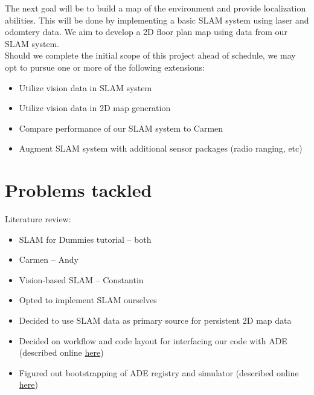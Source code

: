 \documentclass[12pt]{article}
\begin{document}
The next goal will be to build a map of the environment and provide
localization abilities. This will be done by implementing a basic SLAM
system using laser and odomtery data.  We aim to develop a 2D floor plan map
using data from our SLAM system.\\

Should we complete the initial scope of this project ahead of schedule, we may
opt to pursue one or more of the following extensions:

\begin{itemize}
    \setlength{\itemsep}{0pt}
    \setlength{\parskip}{0pt}
    \setlength{\parsep}{0pt}
    \item Utilize vision data in SLAM system
    \item Utilize vision data in 2D map generation
    \item Compare performance of our SLAM system to Carmen
    \item Augment SLAM system with additional sensor packages (radio ranging,
          etc)
\end{itemize}


\section{Problems tackled}

Literature review:
\begin{itemize}
    \setlength{\itemsep}{0pt}
    \setlength{\parskip}{0pt}
    \setlength{\parsep}{0pt}
    \item SLAM for Dummies tutorial -- both
    \item Carmen -- Andy
    \item Vision-based SLAM -- Constantin
\end{itemize}

\begin{itemize}
    \setlength{\itemsep}{0pt}
    \setlength{\parskip}{0pt}
    \setlength{\parsep}{0pt}
    \item Opted to implement SLAM ourselves
    \item Decided to use SLAM data as primary source for persistent 2D map data
\end{itemize}

\begin{itemize}
    \setlength{\itemsep}{0pt}
    \setlength{\parskip}{0pt}
    \setlength{\parsep}{0pt}
    \item Decided on workflow and code layout for interfacing our code with ADE
          (described online
          \href{http://github.com/cberzan/bbr-mapper/raw/master/WORKFLOW}{here})
    \item Figured out bootstrapping of ADE registry and simulator (described
          online 
          \href{http://github.com/cberzan/bbr-mapper/raw/master/BOOTSTRAP}{here})
\end{itemize}
\end{document}
